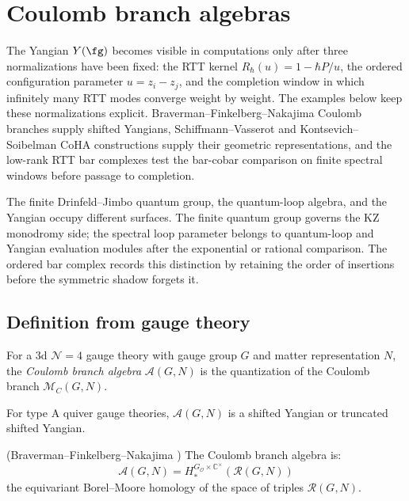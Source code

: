 \section{Coulomb branch algebras}
\label{sec:coulomb-branch}

The Yangian $Y(\fg)$ becomes visible in computations only after three
normalizations have been fixed: the RTT kernel
$R_\hbar(u)=1-\hbar P/u$, the ordered configuration parameter
$u=z_i-z_j$, and the completion window in which infinitely many RTT
modes converge weight by weight. The examples below keep these
normalizations explicit. Braverman--Finkelberg--Nakajima Coulomb
branches supply shifted Yangians, Schiffmann--Vasserot and
Kontsevich--Soibelman CoHA constructions supply their geometric
representations, and the low-rank RTT bar complexes test the
bar-cobar comparison on finite spectral windows before passage to
completion.

The finite Drinfeld--Jimbo quantum group, the quantum-loop algebra,
and the Yangian occupy different surfaces. The finite quantum group
governs the KZ monodromy side; the spectral loop parameter belongs to
quantum-loop and Yangian evaluation modules after the exponential or
rational comparison. The ordered bar complex records this distinction
by retaining the order of insertions before the symmetric shadow
forgets it.

\subsection{Definition from gauge theory}

\begin{definition}\label{def:coulomb-branch}
For a 3d $\mathcal{N} = 4$ gauge theory with gauge group $G$ and matter representation $N$,
the \emph{Coulomb branch algebra} $\mathcal{A}(G, N)$ is the quantization of the
Coulomb branch $\mathcal{M}_C(G, N)$.

For type A quiver gauge theories, $\mathcal{A}(G, N)$ is a shifted Yangian or
truncated shifted Yangian.
\end{definition}

\begin{theorem}\label{thm:bfn}
(Braverman--Finkelberg--Nakajima \cite{BFN18}) The Coulomb branch algebra is:
\[
\mathcal{A}(G, N) = H^{G_{\mathcal{O}} \times \mathbb{C}^\times}_*(\mathcal{R}(G, N))
\]
the equivariant Borel--Moore homology of the space of triples $\mathcal{R}(G, N)$.
\end{theorem}

